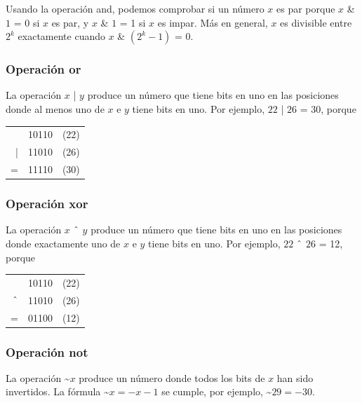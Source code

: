Usando la operación and, podemos comprobar si un número
$x$ es par porque
$x$ \& $1$ = 0 si $x$ es par, y
$x$ \& $1$ = 1 si $x$ es impar.
Más en general, $x$ es divisible entre $2^k$
exactamente cuando $x$ \& $(2^k-1)$ = 0.

\subsubsection{Operación or}


La operación  $x$ | $y$ produce un número
que tiene bits en uno en las posiciones donde al menos uno
de $x$ e $y$ tiene bits en uno.
Por ejemplo, $22$ | $26$ = 30, porque

\begin{center}
\begin{tabular}{rrr}
& 10110 & (22)\\
| & 11010 & (26) \\
\hline
 = & 11110 & (30) \\
\end{tabular}
\end{center}

\subsubsection{Operación xor}


La operación  $x$ $\XOR$ $y$ produce un número
que tiene bits en uno en las posiciones donde exactamente uno
de $x$ e $y$ tiene bits en uno.
Por ejemplo, $22$ $\XOR$ $26$ = 12, porque

\begin{center}
\begin{tabular}{rrr}
& 10110 & (22)\\
$\XOR$ & 11010 & (26) \\
\hline
 = & 01100 & (12) \\
\end{tabular}
\end{center}

\subsubsection{Operación not}


La operación  \textasciitilde$x$
produce un número donde todos los bits de $x$
han sido invertidos.
La fórmula \textasciitilde$x = -x-1$ se cumple,
por ejemplo, \textasciitilde$29 = -30$.

